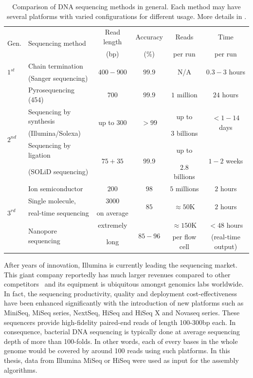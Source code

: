 \begin{table}[ht!]
\centering
\caption[Comparison of DNA sequencing methods in general]{Comparison of DNA sequencing methods in general. Each method may have several platforms with varied configurations for different usage. More details in \cite{Lee2013common,Mardis2017dna}.} 
\label{tab:sequencing}
\begin{tabular}{l|l|c|c|c|c}
\hline
\multirow{2}{*}{Gen.} & \multirow{2}{*}{Sequencing method}& Read length & Accuracy & Reads  & Time \\
& & (bp) & (\%) & per run & per run \\\hline
\multirow{2}{*}{$1^{st}$} & Chain termination & \multirow{2}{*}{$400-900$} & \multirow{2}{*}{$99.9$} & \multirow{2}{*}{N/A} & \multirow{2}{*}{$0.3-3$ hours} \\
& (Sanger sequencing) & & & & \\\hline
\multirow{6}{*}{$2^{nd}$} & Pyrosequencing (454) & $700$ & $99.9$ & $1$ million & $24$ hours\\\cline{2-6}
& Sequencing by synthesis & \multirow{2}{*}{up to $300$} & \multirow{2}{*}{$>99$} & up to & \multirow{2}{*}{$<1-14$ days} \\
& (Illumina/Solexa) & & &  $3$ billions & \\\cline{2-6}
& Sequencing by ligation & \multirow{2}{*}{$75+35$} & \multirow{2}{*}{99.9} & up to & \multirow{2}{*}{$1-2$ weeks} \\
& (SOLiD sequencing) & & & $2.8$ billions & \\\cline{2-6}
& Ion semiconductor & $200$ & $98$ & $5$ millions & $2$ hours\\\hline
\multirow{3}{*}{$3^{rd}$} & Single molecule,  & $3000$ & \multirow{2}{*}{$85$} & \multirow{2}{*}{$\approx 50$K} & \multirow{2}{*}{$2$ hours} \\
& real-time sequencing &  on average & & & \\\cline{2-6}
& \multirow{2}{*}{Nanopore sequencing} & extremely & \multirow{2}{*}{$85-96$} & $\approx 150$K & $<48$ hours\\
& & long & & per flow cell & (real-time output) \\\hline
\end{tabular}
\end{table}  

After years of innovation, Illumina is currently leading the sequencing market. This giant company reportedly has much larger revenues compared to other competitors~\cite{Philippidis2018top}
and its equipment is ubiquitous amongst genomics labs worldwide. 
In fact, the sequencing productivity, quality and deployment cost-effectiveness have been enhanced significantly with the introduction of new platforms such as MiniSeq, MiSeq series, NextSeq, HiSeq and HiSeq X and Novaseq series. These sequencers provide high-fidelity paired-end reads of length 100-300bp each.  In consequence, bacterial DNA sequencing is typically done at average sequencing depth of more than 100-folds.
In other words, each of every bases in the whole genome would be covered by around 100 reads using such platforms.
In this thesis, data from Illumina MiSeq or HiSeq were used as input for the assembly algorithms. 


